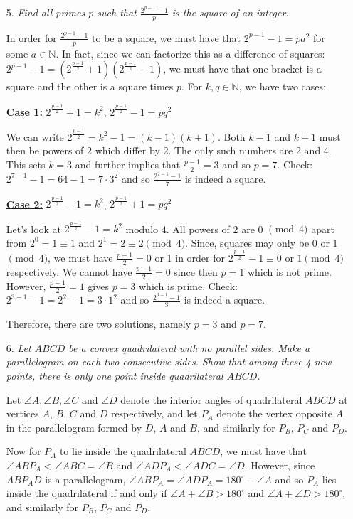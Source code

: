 \documentclass[a4paper,12pt]{article}
\begin{document}
\begin{enumerate}
  \item[5.] \emph{Find all primes $p$ such that $\displaystyle \frac{2^{p-1}-1}{p}$ is the square of an integer.}
  
  In order for $\frac{2^{p-1}-1}{p}$ to be a square, we must have that $2^{p-1}-1 = p a^2$ for some $a\in \mathbb{N}$. In fact, since we can factorize this as a difference of squares:  $2^{p-1}-1 = (2^\frac{p-1}{2}+1)(2^\frac{p-1}{2}-1)$, we must have that one bracket is a square and the other is a square times $p$. For $k,q \in \mathbb{N}$, we have two cases:
  
  \underline{\textbf{Case 1:}} $2^\frac{p-1}{2}+1=k^2$, $2^\frac{p-1}{2}-1 = pq^2$

  We can write $2^\frac{p-1}{2} = k^2-1 = (k-1)(k+1)$. Both $k-1$ and $k+1$ must then be powers of 2 which differ by 2. The only such numbers are 2 and 4. This sets $k=3$ and further implies that $\frac{p-1}{2}=3$ and so $p=7$. Check: $2^{7-1}-1 = 64-1 = 7\cdot 3^2$ and so $\frac{2^{7-1}-1}{7}$ is indeed a square.
  
  \underline{\textbf{Case 2:}} $2^\frac{p-1}{2}-1=k^2$, $2^\frac{p-1}{2}+1 = pq^2$
  
  Let's look at $2^\frac{p-1}{2}-1=k^2$ modulo 4. All powers of 2 are 0 $\pmod{4}$ apart from $2^0=1 \equiv 1$ and $2^1=2 \equiv 2 \pmod{4}$. Since, squares may only be 0 or 1 $\pmod{4}$, we must have $\frac{p-1}{2} = 0$ or 1 in order for $2^\frac{p-1}{2}-1 \equiv 0$ or $1 \pmod{4}$ respectively. We cannot have $\frac{p-1}{2} = 0$ since then $p=1$ which is not prime. However, $\frac{p-1}{2} = 1$ gives $p=3$ which is prime. Check: $2^{3-1}-1 = 2^2-1 = 3\cdot 1^2$ and so $\frac{2^{3-1}-1}{3}$ is indeed a square. 
  
  Therefore, there are two solutions, namely $p=3$ and $p=7$.
  
  
  \item[6.] \emph{Let $ABCD$ be a convex quadrilateral with no parallel sides. Make a parallelogram on each two consecutive sides. Show that among these 4 new points, there is only one point inside quadrilateral $ABCD$.}
  
  Let $\angle A, \angle B, \angle C$ and $\angle D$ denote the interior angles of quadrilateral $ABCD$ at vertices $A$, $B$, $C$ and $D$ respectively, and let $P_A$ denote the vertex opposite $A$ in the parallelogram formed by $D$, $A$ and $B$, and similarly for $P_B$, $P_C$ and $P_D$.
  
  Now for $P_A$ to lie inside the quadrilateral $ABCD$, we must have that $\angle ABP_A < \angle ABC = \angle B$ and $\angle ADP_A < \angle ADC = \angle D$. However, since $ABP_AD$ is a parallelogram, $\angle ABP_A = \angle ADP_A = 180^\circ - \angle A$ and so $P_A$ lies inside the quadrilateral if and only if $\angle A + \angle B > 180^\circ$ and $\angle A + \angle D > 180^\circ$, and similarly for $P_B$, $P_C$ and $P_D$.
  

\end{enumerate}
\end{document}
